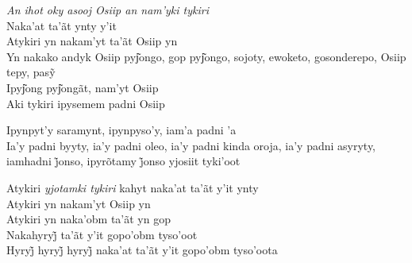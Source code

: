 \noindent   \textit{An ihot oky asooj Osiip an nam'yki tykiri}\\
  Naka'at ta'ãt ynty y'it\\
  Atykiri yn nakam'yt ta'ãt Osiip yn\\
  Yn nakako andyk Osiip pyj͂ongo, gop pyj͂ongo, sojoty, ewoketo, gosonderepo, Osiip tepy, pasỹ\\
  Ipyj͂ong pyj͂ongãt, nam'yt Osiip\\
  Aki tykiri ipysemem padni Osiip
 
 \smallskip
 \begin{center}\end{center}
 \smallskip
 
\noindent   Ipynpyt'y saramynt, ipynpyso'y, iam'a padni 'a\\
  Ia’y padni byyty, ia’y padni oleo, ia’y padni kinda oroja, ia’y padni asyryty, iamhadni j̃onso, ipyrõtamy j̃onso yjosiit tyki’oot
 
 \smallskip
 \begin{center}\end{center}
 \smallskip
 
\noindent   Atykiri \textit{yjotamki tykiri} kahyt naka'at ta'ãt y'it ynty\\
  Atykiri yn nakam'yt Osiip yn\\
  Atykiri yn naka'obm ta'ãt yn gop\\
  Nakahyryj̃ ta’ãt y’it gopo’obm tyso’oot\\
  Hyryj̃ hyryj̃ hyryj̃ naka’at ta’ãt y’it gopo’obm tyso’oota
 
 \smallskip
 \begin{center}\end{center}
 \smallskip
 
